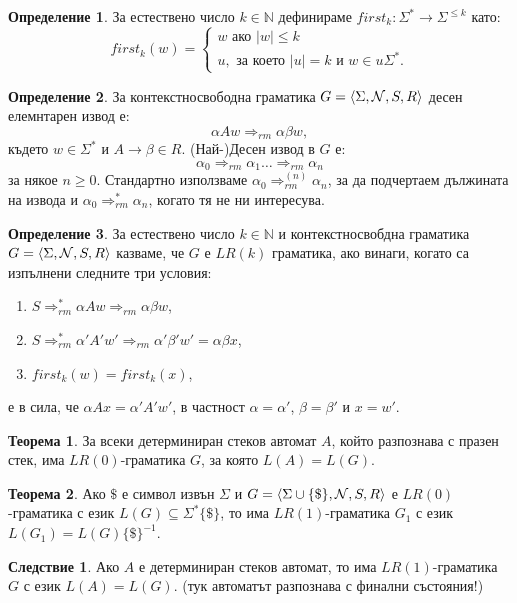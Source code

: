 \documentclass[a4paper]{article}
\theoremstyle{definition}
\newtheorem{theorem}{Теорема}
\newtheorem{corollary}{Следствие}
\newtheorem{definition}{Определение}
\begin{document}
\begin{definition}
За естествено число $k\in \mathbb{N}$ дефинираме $first_k:\Sigma^*\rightarrow \Sigma^{\le k}$ като:
\begin{equation*}
first_k(w) =\begin{cases} w\text{ ако } |w|\le k\\
u, \text{ за което } |u|=k \text{ и } w\in u\Sigma^*.
\end{cases}
\end{equation*}
\end{definition}
\begin{definition}
За контекстносвободна граматика $G=\langle \Sigma,{\cal N},S,R\rangle$ десен елемнтарен извод е:
\begin{equation*}
\alpha A w\Rightarrow_{rm} \alpha \beta w,
\end{equation*}
 където $w\in \Sigma^*$ и $A\rightarrow \beta\in R$. (Най-)Десен извод в $G$ е:
 \begin{equation*}
 \alpha_0\Rightarrow_{rm}\alpha_1\dots \Rightarrow_{rm} \alpha_n
 \end{equation*}
 за някое $n\ge 0$.  Стандартно използваме $\alpha_0\Rightarrow_{rm}^{(n)} \alpha_n$, за да подчертаем
 дължината на извода и $\alpha_0\Rightarrow_{rm}^{*} \alpha_n$, когато тя не ни интересува.
\end{definition}
\begin{definition}
За естествено число $k\in \mathbb{N}$ и контекстносвобдна граматика $G=\langle \Sigma,{\cal N},S,R\rangle$ казваме,
че $G$ е $LR(k)$ граматика, ако винаги, когато са изпълнени следните три условия:
\begin{enumerate}
\item $S\Rightarrow^*_{rm} \alpha A w\Rightarrow_{rm} \alpha \beta w$,
\item $S\Rightarrow^*_{rm} \alpha' A' w'\Rightarrow_{rm} \alpha' \beta' w'=\alpha\beta x$,
\item $first_k(w)=first_k(x)$,
\end{enumerate}
е в сила, че $\alpha A x= \alpha' A' w'$, в частност $\alpha=\alpha'$, $\beta=\beta'$ и $x=w'$.
\end{definition}
\begin{theorem}
За всеки детерминиран стеков автомат $A$, който разпознава с празен стек, има $LR(0)$-граматика $G$, за която
$L(A)=L(G)$. 
\end{theorem}
\begin{theorem}
Ако $\$$ е символ извън $\Sigma$ и $G=\langle \Sigma\cup \{\$\},{\cal N},S,R\rangle$ е $LR(0)$-граматика с език $L(G) \subseteq \Sigma^* \{\$\}$,
то има $LR(1)$-граматика $G_1$ с език $L(G_1)=L(G)\{\$\}^{-1}$. 
\end{theorem}
\begin{corollary}
Ако $A$ е детерминиран стеков автомат, то има $LR(1)$-граматика $G$ с език $L(A)=L(G)$. (тук автоматът разпознава с финални състояния!)
\end{corollary}
\end{document}

